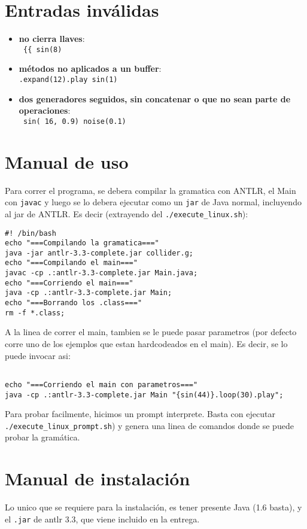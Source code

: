 \documentclass[a4paper]{article}
\begin{document}
\section{Entradas inv\'alidas}
\begin{itemize}
    \item \textbf{no cierra llaves}:\\
        \hbox{\texttt{ \{\{ sin(8)}} 
    \item \textbf{métodos no aplicados a un buffer}:\\
        \hbox{\texttt{.expand(12).play sin(1)  }}
    \item \textbf{dos generadores seguidos, sin concatenar o que no sean parte de operaciones}:\\
        \hbox{\texttt{ sin( 16, 0.9) noise(0.1)  }}
\end{itemize}

\section{Manual de uso}
Para correr el programa, se debera compilar la gramatica con ANTLR, el Main con \texttt{javac} y luego
se lo debera ejecutar como un \texttt{jar}  de Java normal, incluyendo al jar de ANTLR. Es decir (extrayendo del
\texttt{./execute\_linux.sh}): 
\begin{verbatim}
#! /bin/bash
echo "===Compilando la gramatica==="
java -jar antlr-3.3-complete.jar collider.g;
echo "===Compilando el main==="
javac -cp .:antlr-3.3-complete.jar Main.java;
echo "===Corriendo el main==="
java -cp .:antlr-3.3-complete.jar Main;
echo "===Borrando los .class==="
rm -f *.class;
\end{verbatim}
A la linea de correr el main, tambien se le puede pasar parametros (por 
defecto corre uno de los ejemplos que estan hardcodeados en el main). 
Es decir, se lo puede invocar asi:
\begin{verbatim}

echo "===Corriendo el main con parametros==="
java -cp .:antlr-3.3-complete.jar Main "{sin(44)}.loop(30).play";
\end{verbatim}

Para probar facilmente, hicimos un prompt interprete. Basta con ejecutar
\texttt{./execute\_linux\_prompt.sh}) y genera una linea de comandos donde se puede probar la gram\'atica.

\section{Manual de instalaci\'on}
Lo unico que se requiere para la instalaci\'on, es tener presente Java (1.6 basta),
y el \texttt{.jar} de antlr 3.3, que viene incluido en la entrega.
\end{document}
